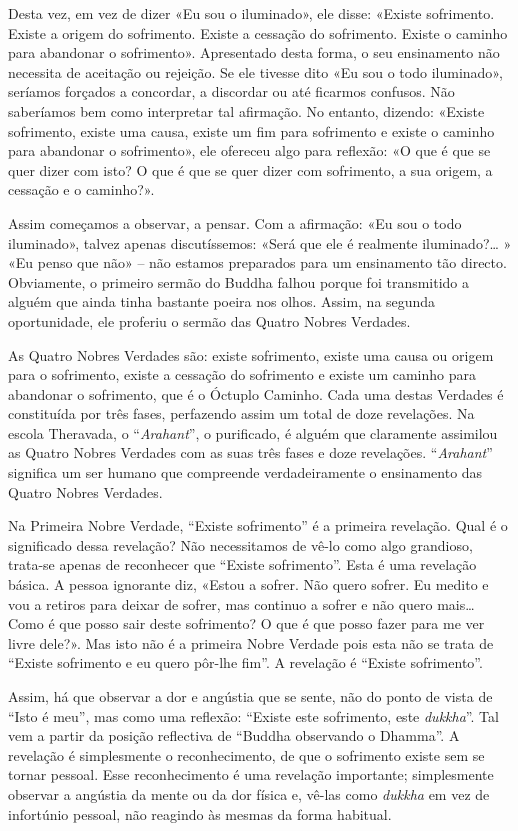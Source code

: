 Desta vez, em vez de dizer «Eu sou o iluminado», ele disse: «Existe sofrimento.
Existe a origem do sofrimento. Existe a cessação do sofrimento. Existe o caminho
para abandonar o sofrimento». Apresentado desta forma, o seu ensinamento não
necessita de aceitação ou rejeição. Se ele tivesse dito «Eu sou o todo
iluminado», seríamos forçados a concordar, a discordar ou até ficarmos confusos.
Não saberíamos bem como interpretar tal afirmação. No entanto, dizendo: «Existe
sofrimento, existe uma causa, existe um fim para sofrimento e existe o caminho
para abandonar o sofrimento», ele ofereceu algo para reflexão: «O que é que se
quer dizer com isto? O que é que se quer dizer com sofrimento, a sua origem, a
cessação e o caminho?».

Assim começamos a observar, a pensar. Com a afirmação: «Eu sou o todo
iluminado», talvez apenas discutíssemos: «Será que ele é realmente
iluminado?\ldots{} » «Eu penso que não» – não estamos preparados para um ensinamento
tão directo. Obviamente, o primeiro sermão do Buddha falhou porque foi
transmitido a alguém que ainda tinha bastante poeira nos olhos. Assim, na
segunda oportunidade, ele proferiu o sermão das Quatro Nobres Verdades.

\sectionBreak

As Quatro Nobres Verdades são: existe sofrimento, existe uma causa ou origem
para o sofrimento, existe a cessação do sofrimento e existe um caminho para
abandonar o sofrimento, que é o Óctuplo Caminho. Cada uma destas Verdades é
constituída por três fases, perfazendo assim um total de doze revelações. Na
escola Theravada, o “\emph{Arahant}”, o purificado, é alguém que claramente
assimilou as Quatro Nobres Verdades com as suas três fases e doze revelações.
“\emph{Arahant}” significa um ser humano que compreende verdadeiramente o
ensinamento das Quatro Nobres Verdades.

Na Primeira Nobre Verdade, “Existe sofrimento” é a primeira revelação. Qual é o
significado dessa revelação? Não necessitamos de vê-lo como algo grandioso,
trata-se apenas de reconhecer que “Existe sofrimento”. Esta é uma revelação
básica. A pessoa ignorante diz, «Estou a sofrer. Não quero sofrer. Eu medito e
vou a retiros para deixar de sofrer, mas continuo a sofrer e não quero
mais\ldots{} Como é que posso sair deste sofrimento? O que é que posso fazer
para me ver livre dele?». Mas isto não é a primeira Nobre Verdade pois esta não
se trata de “Existe sofrimento e eu quero pôr-lhe fim”. A revelação é “Existe
sofrimento”.

Assim, há que observar a dor e angústia que se sente, não do ponto de vista de
“Isto é meu”, mas como uma reflexão: “Existe este sofrimento, este
\emph{dukkha}”. Tal vem a partir da posição reflectiva de “Buddha observando o
Dhamma”. A revelação é simplesmente o reconhecimento, de que o sofrimento existe
sem se tornar pessoal. Esse reconhecimento é uma revelação importante;
simplesmente observar a angústia da mente ou da dor física e, vê-las como
\emph{dukkha} em vez de infortúnio pessoal, não reagindo às mesmas da forma
habitual.

